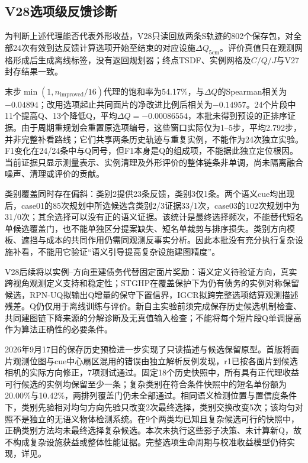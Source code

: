 \documentclass[11pt,a4paper]{article}
\begin{document}
\subsection{V28选项级反馈诊断}

为判断上述代理能否代表外形收益，V28只读回放两条S轨迹的802个保存包，对全部24次有效到达反馈计算选项开始至结束的对应设施$\Delta Q_{5\mathrm{cm}}$。评价真值只在观测网格形成后生成离线标签，没有返回规划器；终点TSDF、实例网格及$C/Q/J$与V27封存结果一致。

末步$\min(1,n_{\mathrm{improved}}/16)$代理的饱和率为54.17\%，与$\Delta Q$的Spearman相关为$-0.04894$；改用选项起止共同面片的净改进比例后相关为$-0.14957$。24个片段中11个提高Q、13个降低Q，平均$\Delta Q=-0.00086554$，本批未得到预设的正排序证据。由于周期重规划会重置原选项编号，这些窗口实际仅为1--5步，平均2.792步，并非完整补看路线；它们共享两条历史轨迹与重复实例，不能作为24次独立实验。F1变化在24/24条中与Q同号，但F1本身是Q的组成项，不能据此独立定位根因。当前证据只显示测量表示、实例清理及外形评价的整体链条非单调，尚未隔离融合噪声、清理或评价的贡献。

类别覆盖同时存在偏斜：类别2提供23条反馈，类别3仅1条。两个语义cue均出现后，case01的85次规划中所选候选含类别2/3证据33/1次，case03的102次规划中为31/0次；其余选择可以没有正的语义证据。该统计是最终选择频次，不能替代短名单候选覆盖门，也不能单独区分提案缺失、短名单裁剪与排序损失。类别方向模板、遮挡与成本的共同作用仍需同观测反事实分析。因此本批没有充分执行复杂设施补看，不能用它验证“语义引导提高复杂设施建图精度”。

V28后续将以实例--方向重建债务代替固定面片奖励：语义定义待验证方向，真实跨视角观测定义支持和稳定性；STGHP在覆盖保护下为仍有债务的实例对称保留候选，RPN-UQ拟输出Q增量的保守下置信界，IGCR拟跨完整选项结算观测描述残差。Q仍仅用于离线训练与评价。新自主实验前须完成保存历史候选机制检查、共同建图链下降来源的分解诊断及无真值输入检查；不能将每个短片段Q单调提高作为算法正确性的必要条件。

2026年9月17日的保存历史预检进一步实现了只读描述与候选保留原型。首版将面片观测位图与cue中心扇区混用的错误由独立解析反例发现，r1已按各面片到候选相机的实际方向修正，7项测试通过。固定18个历史快照中，所有具有正代理收益可行候选的实例均保留至少一条；复杂类别在符合条件快照中的短名单份额为20.00\%与10.42\%，两排列覆盖门仍未全部通过。相同语义检测位置与置信度条件下，类别先验相对均匀方向先验只改变2次最终选择，类别交换改变5次；该均匀对照不是独立的无语义物体检测系统。在9个两类均已知且复杂候选可行的快照中，正确类别方法均未最终选择复杂候选。本次未执行这些影子决策、未计算新Q，故不构成复杂设施获益或整体性能证据。完整选项生命周期与校准收益模型仍待实现，详见。
\end{document}
